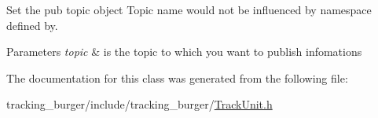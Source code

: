 Set the pub topic object Topic name would not be influenced by namespace defined by. 


\begin{DoxyParams}{Parameters}
{\em topic} & is the topic to which you want to publish infomations \\
\hline
\end{DoxyParams}


The documentation for this class was generated from the following file\+:\begin{DoxyCompactItemize}
\item 
tracking\+\_\+burger/include/tracking\+\_\+burger/\hyperlink{_track_unit_8h}{Track\+Unit.\+h}\end{DoxyCompactItemize}
